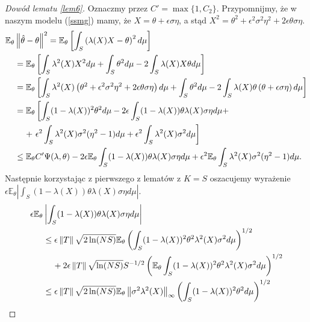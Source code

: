\documentclass[man,mfiu]{mgrwms}
\newcommand{\norm}[1]{\left\lVert#1\right\rVert}
\begin{document}
\begin{proof}[Dowód lematu \ref{lem6}]
Oznaczmy przez $C'=\max\{1,C_2\}$. Przypomnijmy, że w naszym modelu (\ref{ssmg}) mamy, że $X=\theta+\epsilon\sigma\eta$, a stąd $X^2=\theta^2+\epsilon^2\sigma^2\eta^2+2\epsilon\theta\sigma\eta$.
\begin{displaymath}
\begin{split}
\mathbb{E}_{\theta}&\norm{\hat{\theta}-\theta}^2=\mathbb{E}_{\theta}\left[\int_S\left(\lambda(X)X-\theta\right)^2d\mu\right]
\\&=\mathbb{E}_{\theta}\left[\int_S\lambda^2(X)X^2d\mu+\int_S\theta^2d\mu-2\int_S\lambda(X)X\theta d\mu\right]\\
&=\mathbb{E}_{\theta}\left[\int_S\lambda^2(X)\left(\theta^2+\epsilon^2\sigma^2\eta^2+2\epsilon\theta\sigma\eta\right)d\mu+\int_S\theta^2d\mu-2\int_S\lambda(X)\theta\left(\theta+\epsilon\sigma\eta\right)d\mu\right]\\
&=\mathbb{E}_{\theta}\left[\int_S(1-\lambda(X))^2\theta^2d\mu-2\epsilon\int_S(1-\lambda(X))\theta\lambda(X)\sigma\eta d\mu+\right.\\
&\hspace{4mm}+\left.\epsilon^2\int_S\lambda^2(X)\sigma^2(\eta^2-1)d\mu+\epsilon^2\int_S\lambda^2(X)\sigma^2d\mu\right]\\
&\leq \mathbb{E}_{\theta}C'\Psi(\lambda,\theta)-2\epsilon\mathbb{E}_{\theta}\int_S(1-\lambda(X))\theta\lambda(X)\sigma\eta d\mu+\epsilon^2\mathbb{E}_{\theta}\int_S\lambda^2(X)\sigma^2(\eta^2-1)d\mu.
\end{split}
\end{displaymath}
Następnie korzystając z pierwszego z lematów z $K=S$ oszacujemy wyrażenie \\$\epsilon\mathbb{E}_{\theta}\left|\int_S(1-\lambda (X))\theta \lambda (X)\sigma\eta d\mu\right|$. 
\begin{displaymath}
\begin{split}
\epsilon\mathbb{E}_{\theta}&\left|\int_S(1-\lambda (X))\theta \lambda (X)\sigma\eta d\mu\right|\\
&\leq \epsilon\norm{T}\sqrt{2\ln (NS)}\mathbb{E}_{\theta}\left(\int_S(1-\lambda(X))^2\theta ^2\lambda^2(X)\sigma^2d\mu\right)^{1/2}\\
&\hspace{4mm}+2\epsilon\norm{T}\sqrt{\ln (NS)}S^{-1/2}\left(\mathbb{E}_{\theta}\int_S(1-\lambda(X))^2\theta ^2\lambda^2(X)\sigma^2d\mu\right)^{1/2}\\
&\leq \epsilon\norm{T}\sqrt{2\ln (NS)}\mathbb{E}_{\theta}\norm{\sigma^2\lambda^2(X)}_{\infty}\left(\int_S(1-\lambda(X))^2\theta ^2d\mu\right)^{1/2}\\

\end{split}
\end{displaymath}
\end{proof}
\end{document}
